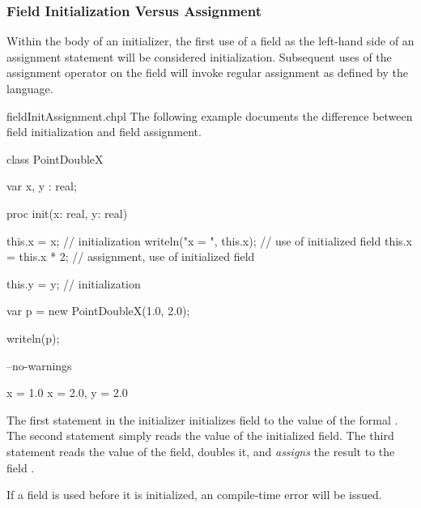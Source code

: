 \subsubsection{Field Initialization Versus Assignment}
\label{Field_Initialization_Versus_Assignment}

Within the body of an initializer, the first use of a field as the left-hand
side of an assignment statement will be considered initialization. Subsequent
uses of the assignment operator on the field will invoke regular assignment as
defined by the language.

\begin{chapelexample}{fieldInitAssignment.chpl}
The following example documents the difference between field initialization
and field assignment.
\begin{chapel}
class PointDoubleX {
  var x, y : real;

  proc init(x: real, y: real) {
    this.x = x;              // initialization
    writeln("x = ", this.x); // use of initialized field
    this.x = this.x * 2;     // assignment, use of initialized field

    this.y = y;              // initialization
  }
}

var p = new PointDoubleX(1.0, 2.0);
\end{chapel}
\begin{chapelpost}
writeln(p);
\end{chapelpost}
\begin{chapelcompopts}
--no-warnings
\end{chapelcompopts}
\begin{chapeloutput}
x = 1.0
{x = 2.0, y = 2.0}
\end{chapeloutput}
The first statement in the initializer initializes field  to the value
of the formal . The second statement simply reads the value of the
initialized field. The third statement reads the value of the field, doubles
it, and {\em assigns} the result to the field .
\end{chapelexample}

If a field is used before it is initialized, an compile-time error will be
issued.

